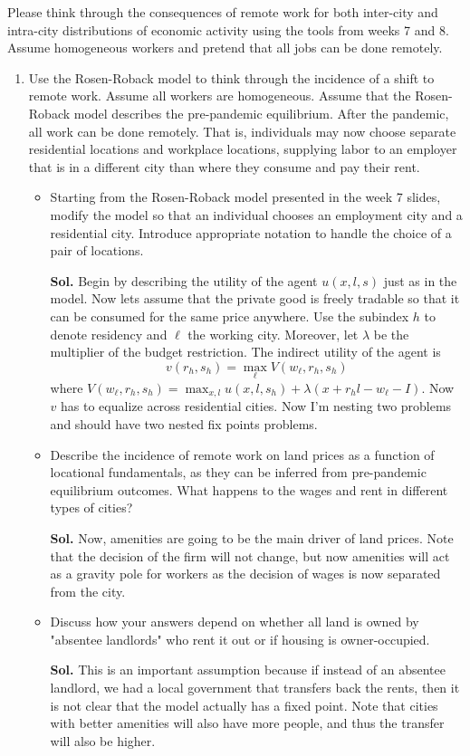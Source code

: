 \documentclass[12pt,oneside,reqno]{amsart}
\begin{document}
Please think through the consequences of remote work for both inter-city and intra-city distributions of economic activity using the tools from weeks 7 and 8. Assume homogeneous workers and pretend that all jobs can be done remotely.
\begin{enumerate}[label=\textbf{\roman*.}]
    \item Use the Rosen-Roback model to think through the incidence of a shift to remote work. Assume all workers are homogeneous. Assume that the Rosen-Roback model describes the pre-pandemic equilibrium. After the pandemic, all work can be done remotely. That is, individuals may now choose separate residential locations and workplace locations, supplying labor to an employer that is in a different city than where they consume and pay their rent.
    \begin{itemize}
        \item Starting from the Rosen-Roback model presented in the week 7 slides, modify the model so that an individual chooses an employment city and a residential city. Introduce appropriate notation to handle the choice of a pair of locations.
        \item[\textbf{Sol.}] Begin by describing the utility of the agent $u(x,l,s)$ just as in the model. Now lets assume that the private good is freely tradable so that it can be consumed for the same price anywhere. Use the subindex $h$ to denote residency and $\ell$ the working city. Moreover, let $\lambda$ be the multiplier of the budget restriction. The indirect utility of the agent is 
        \begin{equation*}
            v(r_h,s_h) = \max_{\ell} V(w_\ell,r_h,s_h)
        \end{equation*}
        where $V(w_\ell,r_h,s_h)=\max_{x,l}u(x,l,s_h) + \lambda\left(x+r_hl-w_\ell-I \right)$. Now $v$ has to equalize across residential cities. Now I'm nesting two problems and should have two nested fix points problems. 
        \item Describe the incidence of remote work on land prices as a function of locational fundamentals, as they can be inferred from pre-pandemic equilibrium outcomes. What happens to the wages and rent in different types of cities?
        \item[\textbf{Sol.}] Now, amenities are going to be the main driver of land prices. Note that the decision of the firm will not change, but now amenities will act as a gravity pole for workers as the decision of wages is now separated from the city. 
        \item Discuss how your answers depend on whether all land is owned by "absentee landlords" who rent it out or if housing is owner-occupied.
        \item[\textbf{Sol.}] This is an important assumption because if instead of an absentee landlord, we had a local government that transfers back the rents, then it is not clear that the model actually has a fixed point. Note that cities with better amenities will also have more people, and thus the transfer will also be higher. 
\end{itemize}


\end{enumerate}
\end{document}
